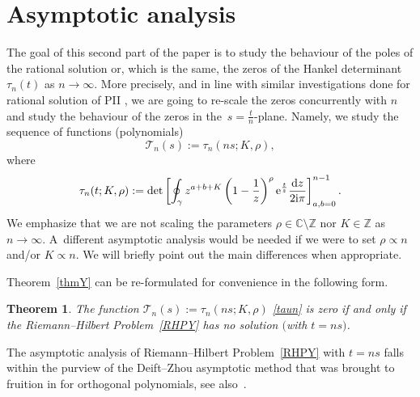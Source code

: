 \documentclass[pdftex]{sigma}
\numberwithin{equation}{section}
\newtheorem{Theorem}{Theorem}[section]
\theoremstyle{definition}
\def\le{\left}
\def\ri{\right}
\def \d{{\mathrm d}}
\def\be{\begin{equation}}
\def\ee{\end{equation}}
\def\C{{\mathbb C}}
\def\Z{{\mathbb Z}}
\def\la{\label}
\begin{document}
 \section{Asymptotic analysis}
 The goal of this second part of the paper is to study the behaviour of the poles of the rational solution or, which is the same, the zeros of the Hankel determinant $\tau_n(t)$ as $n\to \infty$.
 More precisely, and in line with similar investigations done for rational solution of PII \cite{BertolaBothner,BuckMill14, BuckMill15},
 we are going to re-scale the zeros concurrently with $n$ and study the behaviour of the zeros in the~$s =\frac t n $-plane. Namely, we study the sequence of functions (polynomials)
 \be
 \la{taun}
 \mathcal T_n(s):= \tau_n(ns; {K}, { {\rho}}),
 \ee
 where
 \[
 \tau_n(t;{K}, { {\rho}}) := \det\le[
 \oint_\gamma z^{a+b+{K}} \le(1-\frac 1 z\ri)^{ {\rho}} {\rm e}^{\frac t z}\frac{\d z}{2{\rm i}\pi}
 \ri]_{a,b=0}^{n-1}.
 \]
 We emphasize that we are not scaling the parameters ${ {\rho}}\in \C\setminus \Z$ nor $K\in \Z$ as $n\to\infty$. A~different asymptotic analysis would be needed if we were to set ${ {\rho}} \propto n$ and/or $K\propto n$. We will briefly point out the main differences when appropriate.

Theorem~\ref{thmY} can be re-formulated for convenience in the following form.
\begin{Theorem} \label{thmYres}
 The function $\mathcal T_n(s):= \tau_n(ns; K, { {\rho}})$ \eqref{taun} is zero if and only if the Riemann--Hilbert Problem~{\rm\ref{RHPY}} has no solution $($with $t= ns)$.
 \end{Theorem}
 The asymptotic analysis of Riemann--Hilbert Problem~\ref{RHPY} with $t=ns$ falls within the purview of the Deift--Zhou asymptotic method that was brought to fruition in \cite{DKMVZ} for orthogonal polynomials, see also~\cite{BleherIts, Deiftbook}.
\end{document}
